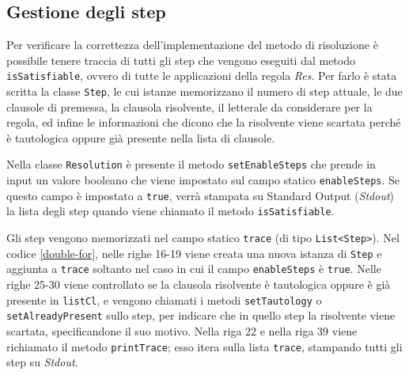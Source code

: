 \documentclass[a4paper,12pt]{report}
\begin{document}
\subsection{Gestione degli step}
\label{step}
Per verificare la correttezza dell'implementazione del metodo di risoluzione è possibile tenere traccia di tutti gli step che vengono eseguiti dal metodo \texttt{isSatisfiable}, ovvero di tutte le applicazioni della regola \emph{Res}. Per farlo è stata scritta la classe \texttt{Step}, le cui istanze memorizzano il numero di step attuale, le due clausole di premessa, la clausola risolvente, il letterale da considerare per la regola, ed infine le informazioni che dicono che la risolvente viene scartata perché è tautologica oppure già presente nella lista di clausole.

Nella classe \texttt{Resolution} è presente il metodo \texttt{setEnableSteps} che prende in input un valore booleano che viene impostato sul campo statico \texttt{enableSteps}. Se questo campo è impostato a \texttt{true}, verrà stampata su Standard Output (\emph{Stdout}) la lista degli step quando viene chiamato il metodo \texttt{isSatisfiable}.

Gli step vengono memorizzati nel campo statico \texttt{trace} (di tipo \texttt{List<Step>}). Nel codice \ref{double-for}, nelle righe 16-19 viene creata una nuova istanza di \texttt{Step} e aggiunta a \texttt{trace} soltanto nel caso in cui il campo \texttt{enableSteps} è \texttt{true}. Nelle righe 25-30 viene controllato se la clausola risolvente è tautologica oppure è già presente in \texttt{listCl}, e vengono chiamati i metodi \texttt{setTautology} o \texttt{setAlreadyPresent} sullo step, per indicare che in quello step la risolvente viene scartata, specificandone il suo motivo. Nella riga 22 e nella riga 39 viene richiamato il metodo \texttt{printTrace}; esso itera sulla lista \texttt{trace}, stampando tutti gli step su \emph{Stdout}. 
\end{document}
